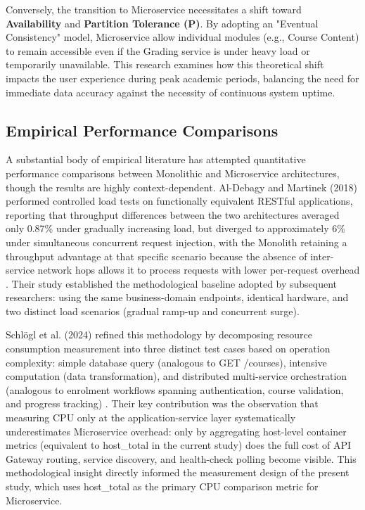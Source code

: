 Conversely, the transition to Microservice necessitates a shift toward \textbf{Availability} and \textbf{Partition Tolerance (P)}. By adopting an "Eventual Consistency" model, Microservice allow individual modules (e.g., Course Content) to remain accessible even if the Grading service is under heavy load or temporarily unavailable. This research examines how this theoretical shift impacts the user experience during peak academic periods, balancing the need for immediate data accuracy against the necessity of continuous system uptime.

\subsection{Empirical Performance Comparisons} 

A substantial body of empirical literature has attempted quantitative performance comparisons between Monolithic and 
Microservice architectures, though the results are highly context-dependent. Al-Debagy and Martinek (2018) 
performed controlled load tests on functionally equivalent 
RESTful applications, reporting that throughput differences between the two architectures 
averaged only 0.87\% under gradually increasing load, but diverged to approximately 6\% 
under simultaneous concurrent request injection, with the Monolith retaining a throughput 
advantage at that specific scenario because the absence of inter-service network hops allows it to process 
requests with lower per-request overhead \cite{Omar_Al-Debagy}. Their study established 
the methodological baseline adopted by subsequent researchers: using the same business-domain 
endpoints, identical hardware, and two distinct load scenarios (gradual ramp-up and concurrent surge).

Schlögl et al. (2024) refined this methodology by decomposing resource consumption measurement 
into three distinct test cases based on operation complexity: simple database 
query (analogous to GET /courses), intensive computation (data transformation), and distributed 
multi-service orchestration (analogous to enrolment workflows spanning authentication, 
course validation, and progress tracking) \cite{Schloegl2024}. Their key contribution 
was the observation that measuring CPU only at the application-service layer systematically 
underestimates Microservice overhead: only by aggregating host-level container 
metrics (equivalent to host\_total in the current study) does the full cost of API Gateway 
routing, service discovery, and health-check polling become visible. This methodological insight 
directly informed the measurement design of the present study, which uses host\_total as the 
primary CPU comparison metric for Microservice.

